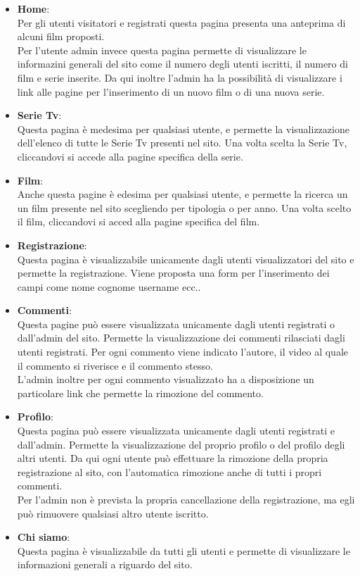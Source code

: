 \begin{itemize}
\item \textbf{Home}:\\
Per gli utenti visitatori e registrati questa pagina presenta una anteprima di alcuni film proposti.\\
Per l'utente admin invece questa pagina permette di visualizzare le informazini generali del sito come il numero degli utenti iscritti, il numero di film e serie inserite. Da qui inoltre l'admin ha la possibilità di visualizzare i link alle pagine per l'inserimento di un nuovo film o di una nuova serie.
\item \textbf{Serie Tv}:\\
Questa pagina è medesima per qualsiasi utente, e permette la visualizzazione dell'elenco di tutte le Serie Tv presenti nel sito. Una volta scelta la Serie Tv, cliccandovi si accede alla pagine specifica della serie.
\item \textbf{Film}:\\
Anche questa pagine è edesima per qualsiasi utente, e permette la ricerca un un film presente nel sito scegliendo per tipologia o per anno. Una volta scelto il film, cliccandovi si acced alla pagine specifica del film.

\item \textbf{Registrazione}:\\
Questa pagina è visualizzabile unicamente dagli utenti visualizzatori del sito e permette la registrazione. Viene proposta una form per l'inserimento dei campi come nome cognome username ecc..

\item \textbf{Commenti}:\\
Questa pagine può essere visualizzata unicamente dagli utenti registrati o dall'admin del sito. Permette la visualizzazione dei commenti rilasciati dagli utenti registrati. Per ogni commento viene indicato l'autore, il video al quale il commento si riverisce e il commento stesso.\\
L'admin inoltre per ogni commento visualizzato ha a disposizione un particolare link che permette la rimozione del commento.

\item \textbf{Profilo}:\\
Questa pagina può essere visualizzata unicamente dagli utenti registrati e dall'admin. Permette la visualizzazione del proprio profilo o del profilo degli altri utenti. Da qui ogni utente può effettuare la rimozione della propria registrazione al sito, con l'automatica rimozione anche di tutti i propri commenti.\\
\n Per l'admin non è prevista la propria cancellazione della registrazione, ma egli può rimuovere qualsiasi altro utente iscritto.

\item \textbf{Chi siamo}:\\
Questa pagina è visualizzabile da tutti gli utenti e permette di visualizzare le informazioni generali a riguardo del sito.


\end{itemize}




